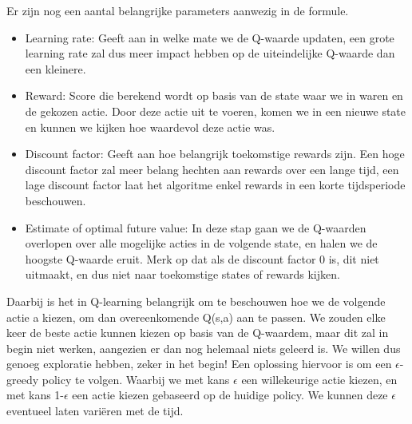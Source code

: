\documentclass[11pt]{article}
\begin{document}
Er zijn nog een aantal belangrijke parameters aanwezig in de formule. 
\begin{itemize}
	\item Learning rate: Geeft aan in welke mate we de Q-waarde updaten, een grote learning rate zal dus meer impact hebben op de uiteindelijke Q-waarde dan een kleinere.
	\item Reward: Score die berekend wordt op basis van de state waar we in waren en de gekozen actie. Door deze actie uit te voeren, komen we in een nieuwe state en kunnen we kijken hoe waardevol deze actie was. 
	\item Discount factor: Geeft aan hoe belangrijk toekomstige rewards zijn. Een hoge discount factor zal meer belang hechten aan rewards over een lange tijd, een lage discount factor laat het algoritme enkel rewards in een korte tijdsperiode beschouwen.
	\item Estimate of optimal future value: In deze stap gaan we de Q-waarden overlopen over alle mogelijke acties in de volgende state, en halen we de hoogste Q-waarde eruit. Merk op dat als de discount factor 0 is, dit niet uitmaakt, en dus niet naar toekomstige states of rewards kijken.
\end{itemize}

Daarbij is het in Q-learning belangrijk om te beschouwen hoe we de volgende actie a kiezen, om dan overeenkomende Q(s,a) aan te passen. We zouden elke keer de beste actie kunnen kiezen op basis van de Q-waardem, maar dit zal in begin niet werken, aangezien er dan nog helemaal niets geleerd is. We willen dus genoeg exploratie hebben, zeker in het begin! Een oplossing hiervoor is om een \(\epsilon\)-greedy policy te volgen. Waarbij we met kans \(\epsilon\) een willekeurige actie kiezen, en met kans 1-\(\epsilon\) een actie kiezen gebaseerd op de huidige policy. We kunnen deze \(\epsilon\) eventueel laten variëren met de tijd.
\end{document}
